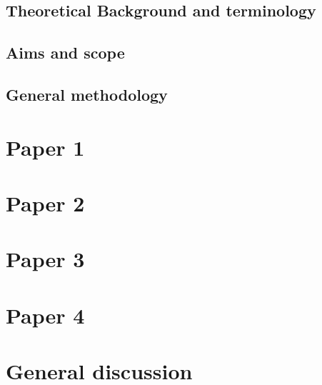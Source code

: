 \documentclass[12pt]{report}
\begin{document}
    \section{Theoretical Background and terminology}
    \label{sec:theory}
        

    \section{Aims and scope}
    \label{sec:aims_scope}
    

    \section{General methodology}
    \label{sec:methods}
    


\chapter{Paper 1}
\label{chap:paper1}

\chapter{Paper 2}
\label{chap:paper2}

\chapter{Paper 3}
\label{chap:paper3}

\chapter{Paper 4}
\label{chap:paper4}

\chapter{General discussion}
\label{chap:discussion}

\printbibliography
\end{document}
